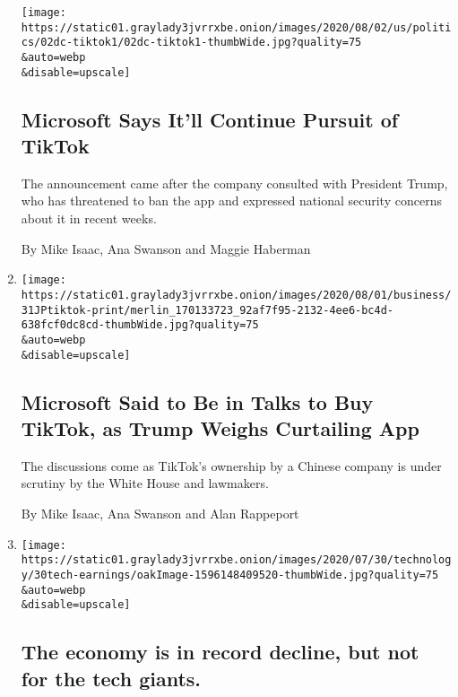 \begin{enumerate}
  \texttt{[image: https://static01.graylady3jvrrxbe.onion/images/2020/08/02/us/politics/02dc-tiktok1/02dc-tiktok1-thumbWide.jpg?quality=75\\\&auto=webp\\\&disable=upscale]}

  \hypertarget{microsoft-says-itll-continue-pursuit-of-tiktok}{%
  \subsection{Microsoft Says It'll Continue Pursuit of
  TikTok}\label{microsoft-says-itll-continue-pursuit-of-tiktok}}

  The announcement came after the company consulted with President
  Trump, who has threatened to ban the app and expressed national
  security concerns about it in recent weeks.

  By Mike Isaac, Ana Swanson and Maggie Haberman
\item
  \href{/2020/07/31/technology/tiktok-microsoft.html}{}

  \texttt{[image: https://static01.graylady3jvrrxbe.onion/images/2020/08/01/business/31JPtiktok-print/merlin\_170133723\_92af7f95-2132-4ee6-bc4d-638fcf0dc8cd-thumbWide.jpg?quality=75\\\&auto=webp\\\&disable=upscale]}

  \hypertarget{microsoft-said-to-be-in-talks-to-buy-tiktok-as-trump-weighs-curtailing-app}{%
  \subsection{Microsoft Said to Be in Talks to Buy TikTok, as Trump
  Weighs Curtailing
  App}\label{microsoft-said-to-be-in-talks-to-buy-tiktok-as-trump-weighs-curtailing-app}}

  The discussions come as TikTok's ownership by a Chinese company is
  under scrutiny by the White House and lawmakers.

  By Mike Isaac, Ana Swanson and Alan Rappeport
\item
  \href{/live/2020/07/31/business/stock-market-today-coronavirus/the-economy-is-in-record-decline-but-not-for-the-tech-giants}{}

  \texttt{[image: https://static01.graylady3jvrrxbe.onion/images/2020/07/30/technology/30tech-earnings/oakImage-1596148409520-thumbWide.jpg?quality=75\\\&auto=webp\\\&disable=upscale]}

  \hypertarget{the-economy-is-in-record-decline-but-not-for-the-tech-giants}{%
  \subsection{The economy is in record decline, but not for the tech
  giants.}\label{the-economy-is-in-record-decline-but-not-for-the-tech-giants}}


\end{enumerate}
